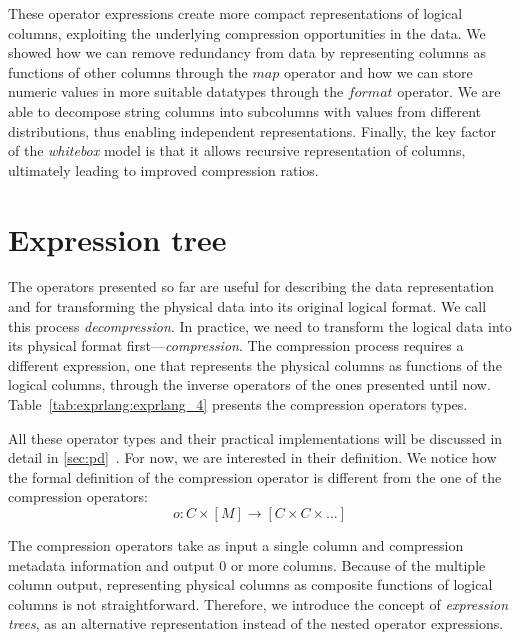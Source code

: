 These operator expressions create more compact representations of logical columns, exploiting the underlying compression opportunities in the data. We showed how we can remove redundancy from data by representing columns as functions of other columns through the \(map\) operator and how we can store numeric values in more suitable datatypes through the \(format\) operator. We are able to decompose string columns into subcolumns with values from different distributions, thus enabling independent representations. Finally, the key factor of the \textit{whitebox} model is that it allows recursive representation of columns, ultimately leading to improved compression ratios.

\section{Expression tree}
\label{sec:exprlang:exprtree}

The operators presented so far are useful for describing the data representation and for transforming the physical data into its original logical format. We call this process \textit{decompression}. In practice, we need to transform the logical data into its physical format first---\textit{compression}. The compression process requires a different expression, one that represents the physical columns as functions of the logical columns, through the inverse operators of the ones presented until now. Table~\ref{tab:exprlang:exprlang_4} presents the compression operators types.



All these operator types and their practical implementations will be discussed in detail in \ref{sec:pd}~. For now, we are interested in their definition. We notice how the formal definition of the compression operator is different from the one of the compression operators:
\begin{equation}
\label{eq:exprlang:exprtree:operator:comp}
    o \colon C \times [M] \to [C \times C \times ...]
\end{equation}

The compression operators take as input a single column and compression metadata information and output 0 or more columns. Because of the multiple column output, representing physical columns as composite functions of logical columns is not straightforward. Therefore, we introduce the concept of \textit{expression trees}, as an alternative representation instead of the nested operator expressions.

